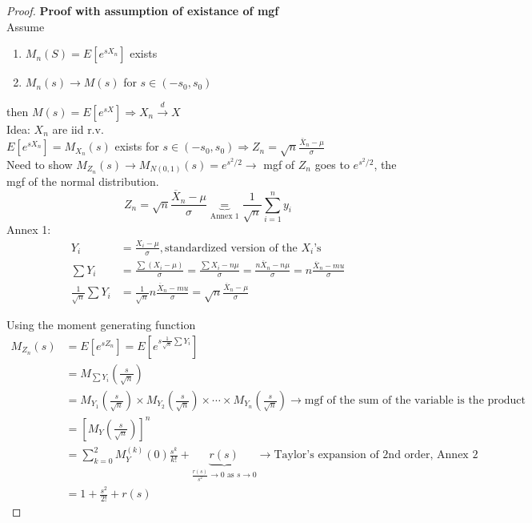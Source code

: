\begin{proof}
    \textbf{Proof with assumption of existance of mgf}\\

    \noindent 
    Assume 
    \begin{enumerate}
        \item $M_n(S) = E[e^{sX_n}]$ exists
        \item $M_n(s)\to M(s)$ for $s\in(-s_0,s_0)$
    \end{enumerate}
    then $M(s) = E[e^{sX}]\Rightarrow X_n\xrightarrow{d}X$\\

    \noindent
    Idea: $X_n$ are iid r.v.\\
    $E[e^{sX_n}] = M_{X_n}(s)$ exists for $s\in(-s_0,s_0) \Rightarrow Z_n = \sqrt{n}\frac{\bar{X}_n-\mu}{\sigma}$\\
    Need to show $M_{Z_n}(s)\to M_{N(0,1)}(s) = e^{s^2/2}\rightarrow$ mgf of $Z_n$ goes to $e^{s^2/2}$, the mgf of the normal distribution.
    \begin{equation}
        Z_n = \sqrt{n}\frac{\overline{X}_n-\mu}{\sigma}\underbrace{=}_{\text{Annex 1}}\frac{1}{\sqrt{n}}\sum_{i=1}^{n}y_i
    \end{equation}
Annex 1: 
\begin{equation*}
\begin{split}
    Y_i & = \frac{X_i-\mu}{\sigma}, \text{standardized version of the $X_i$'s}\\
    \sum Y_i & = \frac{\sum (X_i-\mu)}{\sigma} = \frac{\sum X_i - n\mu}{\sigma} = \frac{n\overline{X}_n-n\mu}{\sigma} = n\frac{\overline{X}_n-mu}{\sigma}\\
    \frac{1}{\sqrt{n}}\sum Y_i & = \frac{1}{\sqrt{n}}n\frac{\overline{X}_n-mu}{\sigma}=\sqrt{n}\frac{\overline{X}_n-\mu}{\sigma}
\end{split}
\end{equation*}

Using the moment generating function
\begin{equation}
    \begin{split}
        M_{Z_n}(s) & = E[e^{sZ_n}] = E[e^{s\frac{1}{\sqrt{n}}\sum Y_i}]\\
        & =M_{\sum Y_i}(\frac{s}{\sqrt{n}})\\
        & =M_{Y_1}(\frac{s}{\sqrt{n}})\times M_{Y_2}(\frac{s}{\sqrt{n}})\times \cdots \times M_{Y_n}(\frac{s}{\sqrt{n}})\rightarrow\text{mgf of the sum of the variable is the product}\\
        & = [M_Y(\frac{s}{\sqrt{n}})]^n\\
        & = \sum_{k=0}^{2}M_Y^{(k)}(0)\frac{s^k}{k!}+\underbrace{r(s)}_{\frac{r(s)}{s^2}\to 0 \text{ as }s\to 0} \rightarrow\text{Taylor's expansion of 2nd order, Annex 2}\\
        & = 1 + \frac{s^2}{2!}+r(s)       
    \end{split}
\end{equation}


\end{proof}
